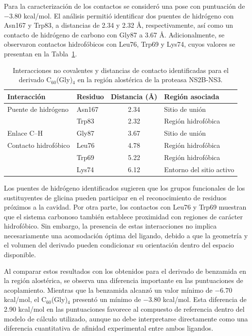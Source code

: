 Para la caracterización de los contactos se consideró una pose con puntuación de $-3.80$ kcal/mol. El análisis permitió identificar dos puentes de hidrógeno con Asn167 y Trp83, a distancias de 2.34 y 2.32 \AA, respectivamente, así como un contacto de hidrógeno de carbono con Gly87 a 3.67 \AA. Adicionalmente, se observaron contactos hidrofóbicos con Leu76, Trp69 y Lys74, cuyos valores se presentan en la Tabla~\ref{tab:interacciones-pose61}.

\begin{table}[H]
    \centering
    \caption{Interacciones no covalentes y distancias de contacto identificadas para el derivado C$_{60}$(Gly)$_4$ en la región alostérica de la proteasa NS2B-NS3.}
    \label{tab:interacciones-pose61}
    \footnotesize
    \renewcommand{\arraystretch}{1.15}
    \begin{tabular}{llcl}
        \toprule
        Interacción & Residuo & Distancia (\AA) & Región asociada \\
        \midrule
        Puente de hidrógeno & Asn167 & 2.34 & Sitio de unión \\
                            & Trp83  & 2.32 & Región hidrofóbica \\
        \midrule
        Enlace C--H & Gly87 & 3.67 & Sitio de unión \\
        \midrule
        Contacto hidrofóbico & Leu76 & 4.78 & Región hidrofóbica \\
                            & Trp69 & 5.22 & Región hidrofóbica \\
                            & Lys74 & 6.12 & Entorno del sitio activo \\
        \bottomrule
    \end{tabular}
\end{table}

Los puentes de hidrógeno identificados sugieren que los grupos funcionales de los sustituyentes de glicina pueden participar en el reconocimiento de residuos próximos a la cavidad. Por otra parte, los contactos con Leu76 y Trp69 muestran que el sistema carbonoso también establece proximidad con regiones de carácter hidrofóbico. Sin embargo, la presencia de estas interacciones no implica necesariamente una acomodación óptima del ligando, debido a que la geometría y el volumen del derivado pueden condicionar su orientación dentro del espacio disponible.

Al comparar estos resultados con los obtenidos para el derivado de benzamida en la región alostérica, se observa una diferencia importante en las puntuaciones de acoplamiento. Mientras que la benzamida alcanzó un valor mínimo de $-6.70$ kcal/mol, el C$_{60}$(Gly)$_4$ presentó un mínimo de $-3.80$ kcal/mol. Esta diferencia de 2.90 kcal/mol en las puntuaciones favorece al compuesto de referencia dentro del modelo de cálculo utilizado, aunque no debe interpretarse directamente como una diferencia cuantitativa de afinidad experimental entre ambos ligandos.

